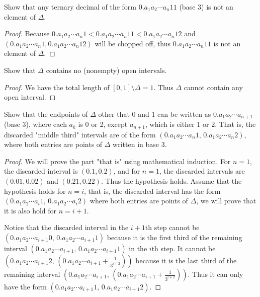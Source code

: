 \documentclass[12pt, a4paper]{article}
\theoremstyle{plain}
\begin{document}
\begin{exercise}{21}
Show that any ternary decimal of the form $0.a_1a_2\cdots a_n11$ (base 3) is not an element of $\Delta$.
\end{exercise}
	\begin{proof}
	Because $0.a_1a_2\cdots a_n1<0.a_1a_2\cdots a_n11<0.a_1a_2\cdots a_n12$ and $(0.a_1a_2\cdots a_n1,0.a_1a_2\cdots a_n12)$ will be chopped off, thus $0.a_1a_2\cdots a_n11$ is not an element of $\Delta$.
	\end{proof}
	
\begin{exercise}{22}
Show that $\Delta$ contains no (nonempty) open intervals.
\end{exercise}
	\begin{proof}
	We have the total length of $[0,1]\setminus\Delta=1$. Thus $\Delta$ cannot contain any open interval.
	\end{proof}

\begin{exercise}{23}
Show that the endpoints of $\Delta$ other that 0 and 1 can be written as $0.a_1a_2\cdots a_{n+1}$ (base 3), where each $a_k$ is 0 or 2, except $a_{n+1}$, which is either 1 or 2. That is, the discarded "middle third" intervals are of the form $(0.a_1a_2\cdots a_n1,\,0.a_1a_2\cdots a_n2)$, where both entries are points of $\Delta$ written in base 3.
\end{exercise}
	\begin{proof}
	We will prove the part "that is" using mathematical induction. For $n=1$, the discarded interval is $(0.1,0.2)$, and for $n=1$, the discarded intervals are $(0.01,0.02)$ and $(0.21,0.22)$. Thus the hypothesis holds. Assume that the hypothesis holds for $n=i$, that is, the discarded interval has the form $(0.a_1a_2\cdots  a_i1,\, 0.a_1a_2\cdots a_i2)$ where both entries are points of $\Delta$, we will prove that it is also hold for $n=i+1$. 
	
	Notice that the discarded interval in the $i+1$th step cannot be $(0.a_1a_2\cdots  a_{i+1}0,\, 0.a_1a_2\cdots a_{i+1}1)$ because it is the first third of the remaining interval $(0.a_1a_2\cdots  a_{i+1},\, 0.a_1a_2\cdots a_{i+1}1)$ in the $i$th step. It cannot be $(0.a_1a_2\cdots  a_{i+1}2,\, (0.a_1a_2\cdots a_{i+1}+\frac{1}{3^{i+2}}))$ because it is the last third of the remaining interval $(0.a_1a_2\cdots  a_{i+1},\, (0.a_1a_2\cdots a_{i+1}+\frac{1}{3^{i+2}}))$. Thus it can only have the form $(0.a_1a_2\cdots  a_{i+1}1,\, 0.a_1a_2\cdots a_{i+1}2)$.
	\end{proof}
\end{document}
